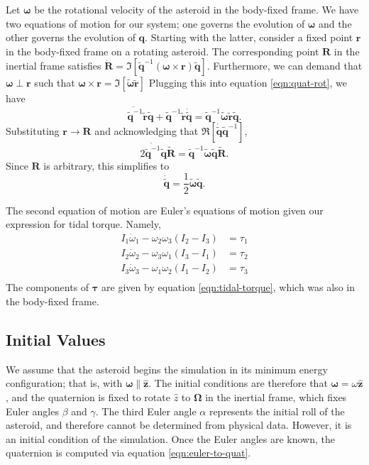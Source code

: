 \documentclass[linenumbers]{aastex631}
\newcommand{\unit}[1]{\hat{\mathbf{#1}}}
\newcommand{\quat}[1]{\widetilde{\bm{#1}}}
\begin{document}
Let $\bm\omega$ be the rotational velocity of the asteroid in the body-fixed frame. We have two equations of motion for our system; one governs the evolution of $\bm \omega$ and the other governs the evolution of $\bm q$. Starting with the latter, consider a fixed point $\bm r$ in the body-fixed frame on a rotating asteroid. The corresponding point $\bm R$ in the inertial frame satisfies $\dot{\bm R} = \Im[\quat q^{-1}(\bm \omega \times \bm r )\quat q]$. Furthermore, we can demand that $\bm \omega \perp \bm r$ such that $\bm \omega \times \bm r = \Im[\quat \omega \quat r]$ Plugging this into equation \ref{eqn:quat-rot}, we have
\begin{equation}
\dot{\quat q^{-1}} \quat r \quat q + \quat q^{-1} \quat r \dot{\quat q} = \quat q^{-1}\quat \omega \quat r \quat q.
\nonumber
\end{equation}
Substituting $\bm r \rightarrow \bm R$ and acknowledging that $\Re[\dot{\quat q} \quat q^{-1}]$,
\begin{equation}
2\dot{\quat q^{-1}}\quat q\quat R = \quat q^{-1}\quat \omega \quat q \quat R.
\nonumber
\end{equation}
Since $\bm R$ is arbitrary, this simplifies to
\begin{equation}
\dot{\quat q} = \frac{1}{2}\quat \omega\quat q.
\label{eqn:quat-eom}
\end{equation}

The second equation of motion are Euler's equations of motion given our expression for tidal torque. Namely,
\begin{eqnarray}
I_1 \dot \omega_1 - \omega_2 \omega_3 (I_2 - I_3) &= \tau_1\\
I_2 \dot \omega_2 - \omega_3 \omega_1 (I_3 - I_1) &= \tau_2\\
I_3 \dot \omega_3 - \omega_1 \omega_2 (I_1 - I_2) &= \tau_3\\
\label{eqn:omega-eom}
\end{eqnarray}
The components of $\bm \tau$ are given by equation \ref{eqn:tidal-torque}, which was also in the body-fixed frame.


\subsection{Initial Values}
We assume that the asteroid begins the simulation in its minimum energy configuration; that is, with $\bm \omega \parallel \unit z$. The initial conditions are therefore that $\bm \omega = \omega \unit z$, and the quaternion is fixed to rotate $\hat z$ to $\bm \Omega$ in the inertial frame, which fixes Euler angles $\beta$ and $\gamma$. The third Euler angle $\alpha$ represents the initial roll of the asteroid, and therefore cannot be determined from physical data. However, it is an initial condition of the simulation. Once the Euler angles are known, the quaternion is computed via equation \ref{eqn:euler-to-quat}.
\end{document}
